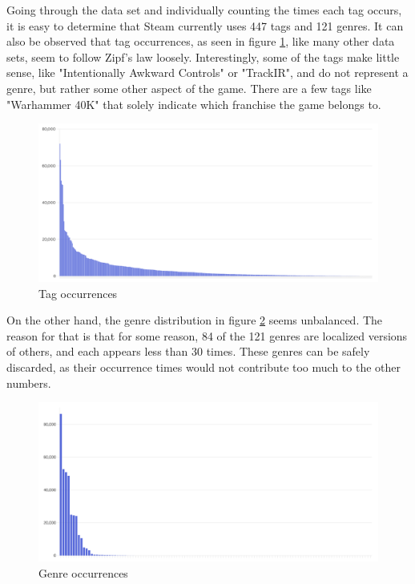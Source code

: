 Going through the data set and individually counting the times each tag occurs, it is easy to determine that Steam currently uses 447 tags and 121 genres. It can also be observed that tag occurrences, as seen in figure \ref{figure:tags}, like many other data sets, seem to follow Zipf's law loosely\cite{li2002zipf}. Interestingly, some of the tags make little sense, like "Intentionally Awkward Controls" or "TrackIR", and do not represent a genre, but rather some other aspect of the game. There are a few tags like "Warhammer 40K" that solely indicate which franchise the game belongs to.

\begin{figure}[h]
    \centering
    \includegraphics[width=\textwidth]{images/tag-occurrences.png}
    \caption{Tag occurrences}
    \label{figure:tags}
\end{figure}

On the other hand, the genre distribution in figure \ref{figure:genres} seems unbalanced. The reason for that is that for some reason, 84 of the 121 genres are localized versions of others, and each appears less than 30 times. These genres can be safely discarded, as their occurrence times would not contribute too much to the other numbers.

\begin{figure}[h]
    \centering
    \includegraphics[width=\textwidth]{images/genre-occurrences.png}
    \caption{Genre occurrences}
    \label{figure:genres}
\end{figure}

